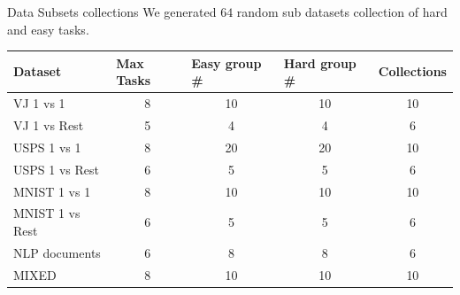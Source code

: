 \documentclass{beamer}
\begin{document}
\begin{frame}{Data Subsets collections}
We generated $64$ random sub datasets collection of hard and easy tasks.   
 \begin{table}
\scriptsize   
\begin{tabular}{|l|c|c|c|c|}
\hline
Dataset & \multicolumn{1}{l|}{Max Tasks} & \multicolumn{1}{l|}{Easy group \#} & \multicolumn{1}{l|}{Hard group \#} & \multicolumn{1}{l|}{Collections} \\ \hline
VJ 1 vs 1 & 8 & 10 & 10 & 10 \\ \cline{1-1}
VJ 1 vs Rest & 5 & 4 & 4 & 6 \\ \cline{1-1}
USPS 1 vs 1 & 8 & 20 & 20 & 10 \\ \cline{1-1}
USPS 1 vs Rest & 6 & 5 & 5 & 6 \\ \cline{1-1}
MNIST 1 vs 1 & 8 & 10 & 10 & 10 \\ \cline{1-1}
MNIST 1 vs Rest & 6 & 5 & 5 & 6 \\ \cline{1-1}
NLP documents & 6 & 8 & 8 & 6 \\ \cline{1-1}
MIXED & 8 & 10 & 10 & 10 \\ \hline
\end{tabular}
\end{table}
\end{frame}
\end{document}
